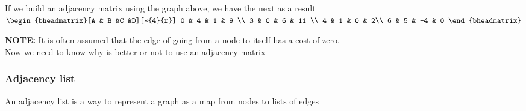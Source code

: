 If we build an adjacency matrix using the graph above, we have the next as a result
$
    \begin{bheadmatrix}[A & B &C &D][*{4}{r}]
        0 & 4 & 1 & 9 \\
        3 & 0 & 6 & 11 \\
        4 & 1 & 0 & 2\\
        6 & 5 & -4 & 0
    \end{bheadmatrix}%
$

\textbf{NOTE:} It is often assumed that the edge of going from a node to itself has a cost of zero.\\

Now we need to know why is better or not to use an adjacency matrix

\begin{table}[H]
    \centering
\end{table}

\subsubsection{Adjacency list}
An adjacency list is a way to represent a graph as a map from nodes to lists of edges


